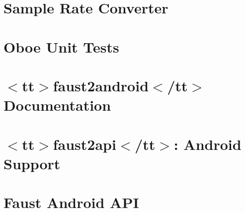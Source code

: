 \let\mypdfximage\pdfximage\def\pdfximage{\immediate\mypdfximage}\documentclass[twoside]{book}
\newcommand{\+}{\discretionary{\mbox{\scriptsize$\hookleftarrow$}}{}{}}
\begin{document}
\chapter{Sample Rate Converter}
\label{md__c_1__users_fab_src__github_branches__neural_amp_modeler_plugin_i_plug2__dependencies__build_4f68168c449bc8404e7b5ed51eafe1fd}

\chapter{Oboe Unit Tests}
\label{md__c_1__users_fab_src__github_branches__neural_amp_modeler_plugin_i_plug2__dependencies__build_e54a3c7f9b217d51884bb6cf095582ee}

\chapter{$<$tt$>$faust2android$<$/tt$>$ Documentation}
\label{md__c_1__users_fab_src__github_branches__neural_amp_modeler_plugin_i_plug2__dependencies__build_13054ba4ea8ade9f86b51363c321412d}

\chapter{$<$tt$>$faust2api$<$/tt$>$\+: Android Support}
\label{md__c_1__users_fab_src__github_branches__neural_amp_modeler_plugin_i_plug2__dependencies__build_3a7167062cb08bf1b33f764501d65c90}

\chapter{Faust Android A\+PI}
\label{md__c_1__users_fab_src__github_branches__neural_amp_modeler_plugin_i_plug2__dependencies__build_25aeb3b1f0c9538ef8a7f57356d01e10}

\end{document}
